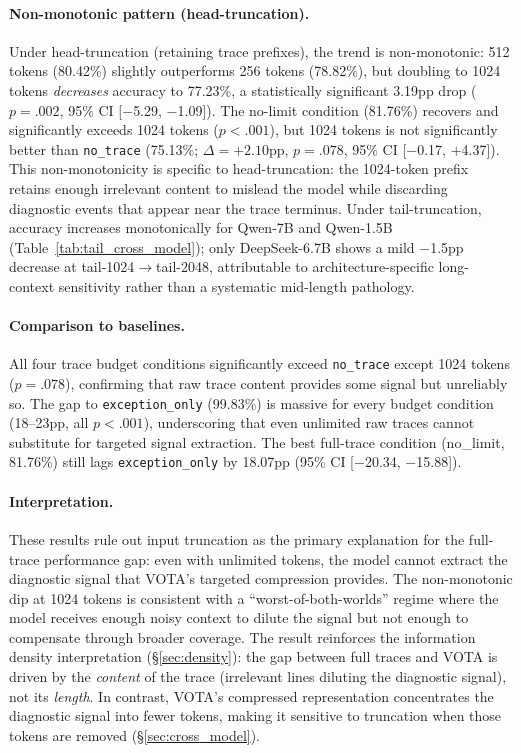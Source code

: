 \paragraph{Non-monotonic pattern (head-truncation).}
Under head-truncation (retaining trace prefixes), the trend is non-monotonic: 512 tokens (80.42\%) slightly outperforms 256 tokens (78.82\%), but doubling to 1024 tokens \emph{decreases} accuracy to 77.23\%, a statistically significant 3.19pp drop ($p{=}.002$, 95\% CI [$-$5.29, $-$1.09]).
The no-limit condition (81.76\%) recovers and significantly exceeds 1024 tokens ($p{<}.001$), but 1024 tokens is not significantly better than \texttt{no\_trace} (75.13\%; $\Delta{=}{+}2.10$pp, $p{=}.078$, 95\% CI [$-$0.17, $+$4.37]).
This non-monotonicity is specific to head-truncation: the 1024-token prefix retains enough irrelevant content to mislead the model while discarding diagnostic events that appear near the trace terminus.
Under tail-truncation, accuracy increases monotonically for Qwen-7B and Qwen-1.5B (Table~\ref{tab:tail_cross_model}); only DeepSeek-6.7B shows a mild $-$1.5pp decrease at tail-1024$\to$tail-2048, attributable to architecture-specific long-context sensitivity rather than a systematic mid-length pathology.

\paragraph{Comparison to baselines.}
All four trace budget conditions significantly exceed \texttt{no\_trace} except 1024 tokens ($p{=}.078$), confirming that raw trace content provides some signal but unreliably so.
The gap to \texttt{exception\_only} (99.83\%) is massive for every budget condition (18--23pp, all $p{<}.001$), underscoring that even unlimited raw traces cannot substitute for targeted signal extraction.
The best full-trace condition (no\_limit, 81.76\%) still lags \texttt{exception\_only} by 18.07pp (95\% CI [$-$20.34, $-$15.88]).

\paragraph{Interpretation.}
These results rule out input truncation as the primary explanation for the full-trace performance gap: even with unlimited tokens, the model cannot extract the diagnostic signal that VOTA's targeted compression provides.
The non-monotonic dip at 1024 tokens is consistent with a ``worst-of-both-worlds'' regime where the model receives enough noisy context to dilute the signal but not enough to compensate through broader coverage.
The result reinforces the information density interpretation (\S\ref{sec:density}): the gap between full traces and VOTA is driven by the \emph{content} of the trace (irrelevant lines diluting the diagnostic signal), not its \emph{length}.
In contrast, VOTA's compressed representation concentrates the diagnostic signal into fewer tokens, making it sensitive to truncation when those tokens are removed (\S\ref{sec:cross_model}).

